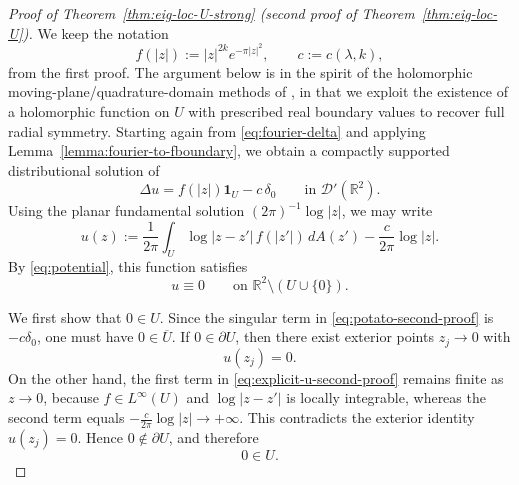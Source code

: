 \documentclass[a4paper,11pt,reqno]{amsart}
\numberwithin{equation}{section}
\theoremstyle{plain} %
\theoremstyle{definition} %
\theoremstyle{remark}
\newcommand{\R}{\mathbb{R}}
\begin{document}
\begin{proof}[Proof of Theorem~\ref{thm:eig-loc-U-strong} (second proof of Theorem~\ref{thm:eig-loc-U})]
We keep the notation
\[
f(|z|):=|z|^{2k}e^{-\pi|z|^2},
\qquad
c:=c(\lambda,k),
\]
from the first proof. The argument below is in the spirit of the holomorphic
moving-plane/quadrature-domain methods of \cite{Aharonov-Schiffer-Zalcman,Gustafsson,Karp},
in that we exploit the existence of a holomorphic function on \(U\) with prescribed real
boundary values to recover full radial symmetry. Starting again from \eqref{eq:fourier-delta} and
applying Lemma~\ref{lemma:fourier-to-fboundary}, we obtain a compactly supported distributional
solution of
\begin{equation}\label{eq:potato-second-proof}
\Delta u=f(|z|)\mathbf{1}_U-c\,\delta_0
\qquad\text{in }\mathcal D'(\R^2).
\end{equation}
Using the planar fundamental solution \((2\pi)^{-1}\log|z|\), we may write
\begin{equation}\label{eq:explicit-u-second-proof}
u(z):=\frac{1}{2\pi}\int_U \log|z-z'|\,f(|z'|)\,dA(z')-\frac{c}{2\pi}\log|z|.
\end{equation}
By \eqref{eq:potential}, this function satisfies
\[
u\equiv 0
\qquad\text{on }\R^2\setminus (U\cup\{0\}).
\]

We first show that \(0\in U\). Since the singular term in
\eqref{eq:potato-second-proof} is \(-c\delta_0\), one must have \(0\in\overline U\). If
\(0\in\partial U\), then there exist exterior points \(z_j\to 0\) with
\[
u(z_j)=0.
\]
On the other hand, the first term in \eqref{eq:explicit-u-second-proof} remains finite as
\(z\to 0\), because \(f\in L^\infty(U)\) and \(\log|z-z'|\) is locally integrable, whereas the
second term equals \(-\frac{c}{2\pi}\log|z|\to +\infty\). This contradicts the exterior identity
\(u(z_j)=0\). Hence \(0\notin\partial U\), and therefore
\[
0\in U.
\]


\end{proof}
\end{document}
